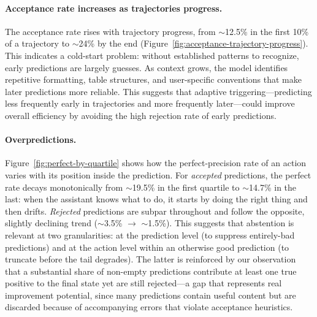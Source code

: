 \documentclass{article}
\theoremstyle{plain}
\theoremstyle{definition}
\theoremstyle{remark}
\begin{document}
\paragraph{Acceptance rate increases as trajectories progress.}

The acceptance rate rises with trajectory progress, from $\sim$12.5\% in the first 10\% of a trajectory to $\sim$24\% by the end (Figure~\ref{fig:acceptance-trajectory-progress}).
This indicates a cold-start problem: without established patterns to recognize, early predictions are largely guesses.
As context grows, the model identifies repetitive formatting, table structures, and user-specific conventions that make later predictions more reliable.
This suggests that adaptive triggering---predicting less frequently early in trajectories and more frequently later---could improve overall efficiency by avoiding the high rejection rate of early predictions.



\paragraph{Overpredictions.}

Figure~\ref{fig:perfect-by-quartile} shows how the perfect-precision rate of an action varies with its position inside the prediction.
For \emph{accepted} predictions, the perfect rate decays monotonically from $\sim$19.5\% in the first quartile to $\sim$14.7\% in the last: when the assistant knows what to do, it starts by doing the right thing and then drifts.
\emph{Rejected} predictions are subpar throughout and follow the opposite, slightly declining trend ($\sim$3.5\% $\to$ $\sim$1.5\%).
This suggests that abstention is relevant at two granularities: at the prediction level (to suppress entirely-bad predictions) and at the action level within an otherwise good prediction (to truncate before the tail degrades).
The latter is reinforced by our observation that a substantial share of non-empty predictions contribute at least one true positive to the final state yet are still rejected---a gap that represents real improvement potential, since many predictions contain useful content but are discarded because of accompanying errors that violate acceptance heuristics.
\end{document}
